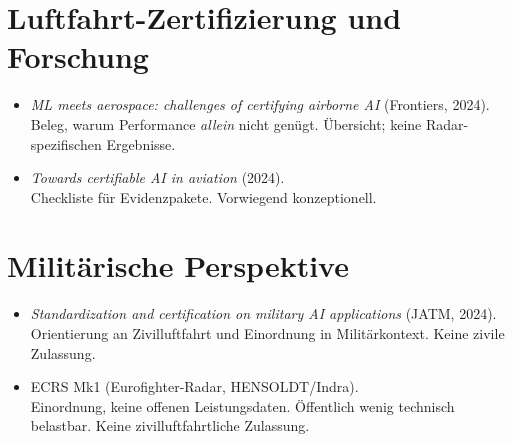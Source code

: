 \section{Luftfahrt-Zertifizierung und Forschung}
\begin{itemize}
  \item \textit{ML meets aerospace: challenges of certifying airborne AI} (Frontiers, 2024).\\
      {Beleg, warum Performance \emph{allein} nicht genügt.}
      {Übersicht; keine Radar-spezifischen Ergebnisse.}

  \item \textit{Towards certifiable AI in aviation} (2024).\\
      {Checkliste für Evidenzpakete.}
      {Vorwiegend konzeptionell.}
\end{itemize}

\section{Militärische Perspektive}
\begin{itemize}
  \item \textit{Standardization and certification on military AI applications} (JATM, 2024).\\
      {Orientierung an Zivilluftfahrt und Einordnung in Militärkontext.}
      {Keine zivile Zulassung.}

  \item ECRS Mk1 (Eurofighter-Radar, HENSOLDT/Indra).\\
      {Einordnung, keine offenen Leistungsdaten.}
      {Öffentlich wenig technisch belastbar. Keine zivilluftfahrtliche Zulassung.}
\end{itemize}

